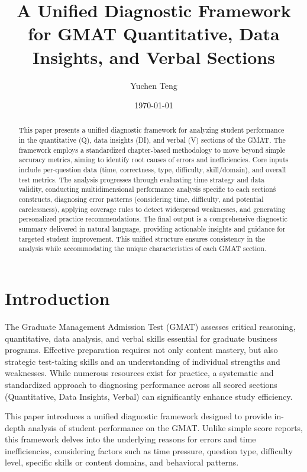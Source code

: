 \documentclass{article}
\title{A Unified Diagnostic Framework for GMAT Quantitative, Data Insights, and Verbal Sections}
\author{Yuchen Teng} %
\date{\today}
\begin{document}

\maketitle

\begin{abstract}
This paper presents a unified diagnostic framework for analyzing student performance in the quantitative (Q), data insights (DI), and verbal (V) sections of the GMAT. The framework employs a standardized chapter-based methodology to move beyond simple accuracy metrics, aiming to identify root causes of errors and inefficiencies. Core inputs include per-question data (time, correctness, type, difficulty, skill/domain), and overall test metrics. The analysis progresses through evaluating time strategy and data validity, conducting multidimensional performance analysis specific to each section\'s constructs, diagnosing error patterns (considering time, difficulty, and potential carelessness), applying coverage rules to detect widespread weaknesses, and generating personalized practice recommendations. The final output is a comprehensive diagnostic summary delivered in natural language, providing actionable insights and guidance for targeted student improvement. This unified structure ensures consistency in the analysis while accommodating the unique characteristics of each GMAT section.
\end{abstract}

\section{Introduction}

The Graduate Management Admission Test (GMAT) assesses critical reasoning, quantitative, data analysis, and verbal skills essential for graduate business programs. Effective preparation requires not only content mastery, but also strategic test-taking skills and an understanding of individual strengths and weaknesses. While numerous resources exist for practice, a systematic and standardized approach to diagnosing performance across all scored sections (Quantitative, Data Insights, Verbal) can significantly enhance study efficiency.

This paper introduces a unified diagnostic framework designed to provide in-depth analysis of student performance on the GMAT. Unlike simple score reports, this framework delves into the underlying reasons for errors and time inefficiencies, considering factors such as time pressure, question type, difficulty level, specific skills or content domains, and behavioral patterns.
\end{document}
